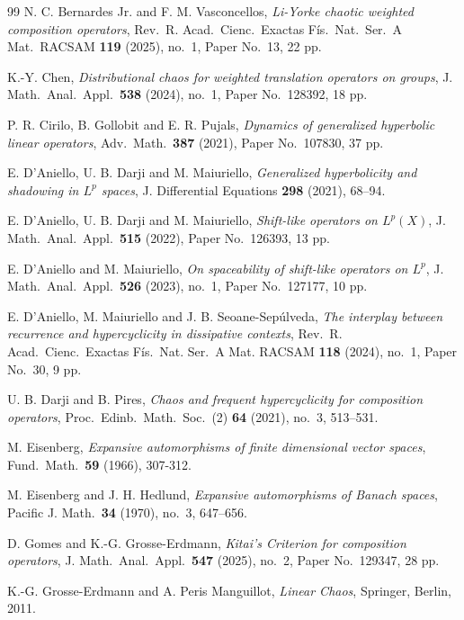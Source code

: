 \documentclass[12pt]{article}
\theoremstyle{plain}
\theoremstyle{definition}
\begin{document}
\begin{thebibliography}{99}
 N. C. Bernardes Jr. and F. M. Vasconcellos,
    {\it Li-Yorke chaotic weighted composition operators},
    Rev.\ R. Acad.\ Cienc.\ Exactas F\'is.\ Nat.\ Ser.\ A Mat.\ RACSAM {\bf 119} (2025), no.\ 1, Paper No.\ 13, 22 pp.

 K.-Y. Chen, 
    {\it Distributional chaos for weighted translation operators on groups}, 
    J. Math.\ Anal.\ Appl.\ {\bf 538} (2024), no.\ 1, Paper No.\ 128392, 18 pp.

 P. R. Cirilo, B. Gollobit and E. R. Pujals,
    {\it Dynamics of generalized hyperbolic linear operators}, Adv.\ Math.\ {\bf 387} (2021), Paper No.\ 107830, 37 pp.

 E. D'Aniello, U. B. Darji and M. Maiuriello,
    {\it Generalized hyperbolicity and shadowing in $L^p$ spaces}, J. Differential Equations {\bf 298} (2021), 68--94.

 E. D'Aniello, U. B. Darji and M. Maiuriello,
    {\it Shift-like operators on $L^p(X)$}, J. Math.\ Anal.\ Appl.\ {\bf 515} (2022), Paper No.\ 126393, 13 pp.

 E. D'Aniello and M. Maiuriello,
    {\it On spaceability of shift-like operators on $L^p$}, J. Math.\ Anal.\ Appl.\ {\bf 526} (2023), no.\ 1, Paper No.\ 127177, 10 pp.

 E. D'Aniello, M. Maiuriello and J. B. Seoane-Sep\'ulveda,
    {\it The interplay between recurrence and hypercyclicity in dissipative contexts},
    Rev.\ R. Acad.\ Cienc.\ Exactas F\'is.\ Nat. Ser.\ A Mat. RACSAM {\bf 118} (2024), no.\ 1, Paper No.\ 30, 9 pp.

 U. B. Darji and B. Pires, 
    {\it Chaos and frequent hypercyclicity for composition operators}, Proc.\ Edinb.\ Math.\ Soc.\ (2) {\bf 64} (2021), no.\ 3, 513--531.

 M. Eisenberg,
    {\it Expansive automorphisms of  finite dimensional vector spaces}, Fund.\ Math.\ {\bf 59} (1966), 307-312.

 M. Eisenberg and J. H. Hedlund,
    {\it Expansive automorphisms of Banach spaces}, Pacific J. Math.\ {\bf 34} (1970), no.\ 3, 647--656.

 D. Gomes and K.-G. Grosse-Erdmann, 
    {\it Kitai's Criterion for composition operators}, J. Math.\ Anal.\ Appl.\ {\bf 547} (2025), no.\ 2, Paper No.\ 129347, 28 pp. 

 K.-G. Grosse-Erdmann and A. Peris Manguillot,
    {\it Linear Chaos}, Springer, Berlin, 2011.


\end{thebibliography}
\end{document}
